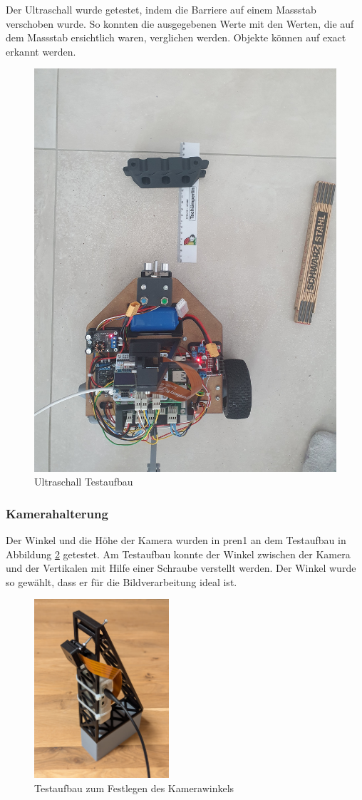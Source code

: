 Der Ultraschall wurde getestet, indem die Barriere auf einem Massstab verschoben wurde. So konnten die ausgegebenen Werte mit den Werten, die auf dem Massstab ersichtlich waren, verglichen werden. Objekte können auf \pm 1cm exact erkannt werden.

\begin{figure}[H]
    \centering
    \includegraphics[width=0.5\linewidth]{assets/ET/ultraschall/ultraschall-test.jpg}
    \caption{Ultraschall Testaufbau}
    \label{fig:ultraschall-tests}
\end{figure}

\subsubsection{Kamerahalterung}
\label{Kamera Halter}

Der Winkel und die Höhe der Kamera wurden in \acrshort{pren1} an dem Testaufbau in Abbildung \ref{fig:Testaufbau zum Festlegen des Kamerawinkels} getestet. Am Testaufbau konnte der Winkel zwischen der Kamera und der Vertikalen mit Hilfe einer Schraube verstellt werden. Der Winkel wurde so gewählt, dass er für die Bildverarbeitung ideal ist. 

\begin{figure}[H]
\centering
\includegraphics[width=5cm]{assets/MT/camer_tower_2.png}
\caption{Testaufbau zum Festlegen des Kamerawinkels}
\label{fig:Testaufbau zum Festlegen des Kamerawinkels}
\end{figure}


